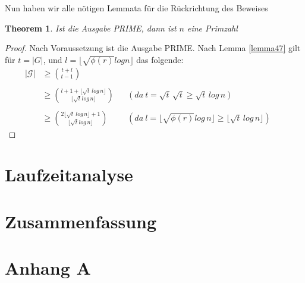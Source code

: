 \documentclass[12pt,oneside]{article}
\newtheorem{theorem}{Theorem}[section]
\theoremstyle{remark}
\theoremstyle{definition}
\begin{document}
Nun haben wir alle nötigen Lemmata für die Rückrichtung des Beweises

\begin{theorem}
Ist die Ausgabe PRIME, dann ist $n$ eine Primzahl 
\end{theorem}

\begin{proof}
Nach Voraussetzung ist die Ausgabe PRIME. Nach Lemma \ref{lemma47} gilt für $t = |G|$, und $l = \lfloor \sqrt{\phi(r)} log n \rfloor$ das folgende:\newline
\begin{align*}
|\mathcal{G}| & \geq {t + l \choose t - 1} \\
\\
& \geq {l + 1 + \lfloor \sqrt{t} \, log \, n \rfloor \choose \lfloor \sqrt{t} log \, n \rfloor} && (da \: t = \sqrt{t} \,
\sqrt{t} \geq \sqrt{t} \,  log \, n) && \\
\\
& \geq {2 \lfloor \sqrt{t} \, log \,  n \rfloor + 1 \choose \lfloor \sqrt{t} log \, n \rfloor} && (da \: l = \lfloor \sqrt{\phi(r)} log \, n \rfloor \geq \lfloor \sqrt{t} \, log \, n \rfloor)
\end{align*}
\end{proof}

\section{Laufzeitanalyse}

\section{Zusammenfassung}


\clearpage
\lhead{}
\printbibliography
{}


\clearpage
\appendix
\section{Anhang A}


\end{document}
